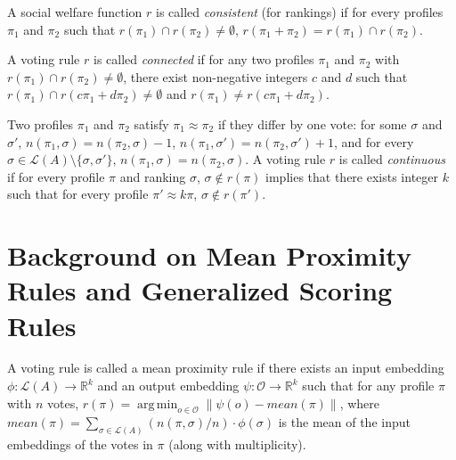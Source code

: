 \documentclass[10pt,letterpaper]{article}
\newcommand{\calL}{{\mathcal{L}}}
\newcommand{\rank}{{\calL(A)}}
\newcommand{\calO}{{\mathcal{O}}}
\DeclareMathOperator*{\argmin}{arg\,min}
\newenvironment{definition}[1][Definition]{\begin{trivlist}
\item[\hskip \labelsep {\bfseries #1}]}{\end{trivlist}}
\begin{document}

\begin{definition}[Consistency] %
A social welfare function $r$ is called \emph{consistent} (for rankings) if for every profiles $\pi_1$ and $\pi_2$ such that $r(\pi_1) \cap r(\pi_2) \neq \emptyset$, $r(\pi_1+\pi_2) = r(\pi_1) \cap r(\pi_2)$. %
\end{definition}


\begin{definition}[Connectedness]
A voting rule $r$ is called \emph{connected} if for any two profiles $\pi_1$ and $\pi_2$ with $r(\pi_1) \cap r(\pi_2) \neq \emptyset$, there exist non-negative integers $c$ and $d$ such that $r(\pi_1) \cap r(c \pi_1 + d \pi_2) \neq \emptyset$ and $r(\pi_1) \neq r(c \pi_1 + d \pi_2)$. 
\end{definition}


\begin{definition}[Continuity]
Two profiles $\pi_1$ and $\pi_2$ satisfy $\pi_1 \approx \pi_2$ if they differ by one vote: for some $\sigma$ and $\sigma'$, $n(\pi_1,\sigma) = n(\pi_2,\sigma)-1$, $n(\pi_1,\sigma') = n(\pi_2,\sigma')+1$, and for every $\sigma \in \rank\setminus\{\sigma,\sigma'\}$, $n(\pi_1,\sigma) = n(\pi_2,\sigma)$. A voting rule $r$ is called \emph{continuous} if for every profile $\pi$ and ranking $\sigma$, $\sigma \notin r(\pi)$ implies that there exists integer $k$ such that for every profile $\pi' \approx k \pi$, $\sigma \notin r(\pi')$. 
\end{definition}


\section{Background on Mean Proximity Rules and Generalized Scoring Rules}


\begin{definition}[Mean Proximity Rules (Zwicker~\cite{Zwicker08a})]
A voting rule is called a mean proximity rule if there exists an input embedding $\phi : \rank \rightarrow \mathbb{R}^k$ and an output embedding $\psi: \calO \rightarrow \mathbb{R}^k$ such that for any profile $\pi$ with $n$ votes, $r(\pi) = \argmin_{o \in \calO} \|\psi(o) - mean(\pi) \|$, where $mean(\pi) = \sum_{\sigma \in \rank} (n(\pi,\sigma)/n) \cdot \phi(\sigma)$ is the mean of the input embeddings of the votes in $\pi$ (along with multiplicity). 
\end{definition}
\end{document}
